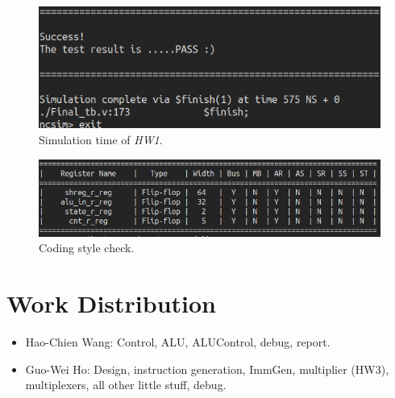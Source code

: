 \documentclass[12pt]{article}
\begin{document}
\begin{figure}[H]
	\centering
	\includegraphics[width=\linewidth]{./hw1.png}
	\caption{Simulation time of \textit{HW1}.}%
	\label{fig:hw1}
\end{figure}

\begin{figure}[H]
	\centering
	\includegraphics[width=\linewidth]{./ff.png}
	\caption{Coding style check.}%
	\label{fig:ff}
\end{figure}

\section{Work Distribution}%
\label{sec:work_distribution}

\begin{itemize}
	\item Hao-Chien Wang: Control, ALU, ALUControl, debug, report.
	\item Guo-Wei Ho: Design, instruction generation, ImmGen, multiplier (HW3), multiplexers, all other little stuff, debug.
\end{itemize}
\end{document}
